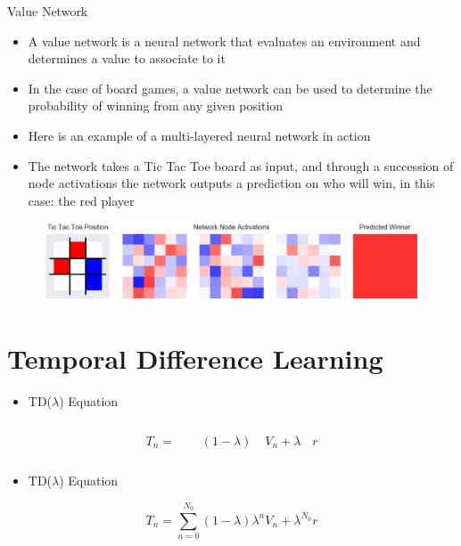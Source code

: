 \begin{frame}[plain]{Value Network}
\begin{itemize}
\item A value network is a neural network that evaluates an environment and determines a value to associate to it
\item In the case of board games, a value network can be used to determine the probability of winning from any given position
\item Here is an example of a multi-layered neural network in action
\item The network takes a Tic Tac Toe board as input, and through a succession of node activations the network outputs a prediction on who will win, in this case: the red player
\end{itemize}
\begin{figure}
\includegraphics[width=1. \textwidth]{network_weights}
\end{figure}
\end{frame}

\section{Temporal Difference Learning}

\begin{frame}
\begin{itemize}
\item TD($\lambda$) Equation
\end{itemize}
\begin{equation*}
T_n = \phantom{\sum_{n=0}^{N_0} }(1-\lambda)\phantom{\lambda^n} V_n + \lambda^{\phantom{N_0}} r
\end{equation*}
\end{frame}

\begin{frame}
\begin{itemize}
\item TD($\lambda$) Equation
\end{itemize}
\begin{equation*}
T_n = \sum_{n=0}^{N_0} (1-\lambda)\lambda^n V_n + \lambda^{N_0} r
\end{equation*}
\end{frame}
